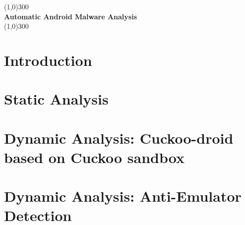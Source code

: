 \documentclass{article}
\begin{document}
	\begin{titlepage}
		\begin{center}
			\line(1,0){300}\\
			\huge{\bfseries Automatic Android Malware Analysis}\\
			\line(1,0){300}\\
		\end{center}
	\end{titlepage}
	
	\tableofcontents
	\cleardoublepage
	
	\section{Introduction}\label{sec:intro}
		
		\pagebreak
	\section{Static Analysis}\label{sec:static_analysis}
		
		\pagebreak
	\section{Dynamic Analysis: Cuckoo-droid based on Cuckoo sandbox}\label{sec:cuckoodroid}
		
		\pagebreak
	
	\section{Dynamic Analysis: Anti-Emulator Detection}
		
		\pagebreak
	
	
	
\end{document}
